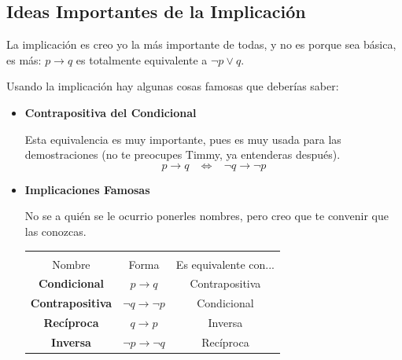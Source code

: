 \documentclass[12pt, fleqn]{report}                             %
\DeclareMathOperator \Space     {\quad}                         %
\DeclareMathOperator \MiniSpace {\;}                            %
\theoremstyle{break}                                            %
\newcommand \lEqual  {\MiniSpace \Leftrightarrow \MiniSpace}    %
\begin{document}
                \subsection{Ideas Importantes de la Implicación}

                    La implicación es creo yo la más importante de todas, y no es porque sea básica, 
                    es más: $p \to q$ es totalmente equivalente a $\lnot p \lor q$.

                    Usando la implicación hay algunas cosas famosas que deberías saber:

                    \begin{itemize}
                        \item \textbf{Contrapositiva del Condicional}
                                
                            Esta equivalencia es muy importante, pues es muy usada para las demostraciones
                            (no te preocupes Timmy, ya entenderas después).
                            \begin{equation*}
                                p \to q \lEqual \lnot q \to \lnot p
                            \end{equation*}

                        \item \textbf{Implicaciones Famosas}

                            No se a quién se le ocurrio ponerles nombres, pero creo que te convenir
                            que las conozcas.

                            \begin{tabular}{ |c|c|c| } 
                                \hline &&\\
                                \large{Nombre} & \large{Forma} & \large{Es equivalente con...}      \\[0.5em]
                                \hline \hline
                                
                                \textbf{Condicional}    & $p \to q$             & Contrapositiva    \\ \hline
                                \textbf{Contrapositiva} & $\lnot q \to \lnot p$ & Condicional       \\ \hline\hline 

                                \textbf{Recíproca}      & $q \to p$             & Inversa           \\ \hline
                                \textbf{Inversa}        & $\lnot p \to \lnot q$ & Recíproca         \\ \hline
                            \end{tabular}

                    \end{itemize}
\end{document}
